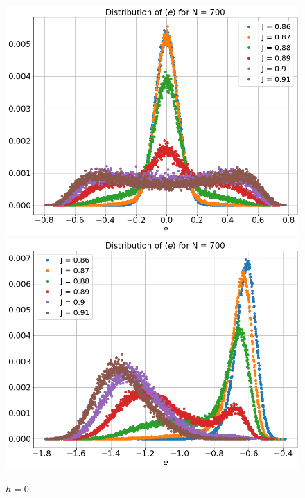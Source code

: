   \begin{figure}
	\centering
	\includegraphics[scale=0.25]{Images/distr_cos_700.png}
	\includegraphics[scale=0.25]{Images/distr_energy_700.png}
	\caption{$h=0$.  }
	\label{fig:distributions_3D}
\end{figure}